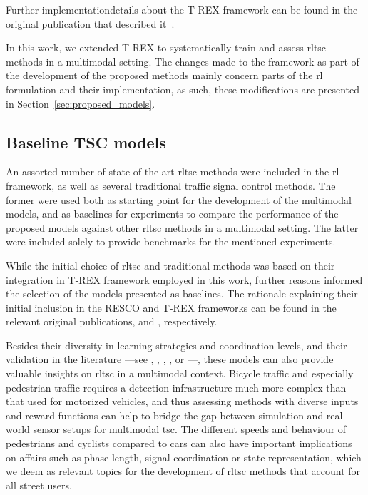 Further implementationdetails about the T-REX framework can be found in the original publication that described it~\cite{Nguyen2025}.

\medskip

\noindent In this work, we extended T-REX to systematically train and assess \gls{rltsc} methods in a multimodal setting. The changes made to the framework as part of the development of the proposed methods mainly concern parts of the \gls{rl} formulation and their implementation, as such, these modifications are presented in Section~\ref{sec:proposed_models}.

\subsection{Baseline TSC models} \label{subsec:baseline_models}
An assorted number of state-of-the-art \gls{rltsc} methods were included in the \gls{rl} framework, as well as several traditional traffic signal control methods. The former were used both as starting point for the development of the multimodal models, and as baselines for experiments to compare the performance of the proposed models against other \gls{rltsc} methods in a multimodal setting. The latter were included solely to provide benchmarks for the mentioned experiments.

While the initial choice of \gls{rltsc} and traditional methods was based on their integration in T-REX framework employed in this work, further reasons informed the selection of the models presented as baselines. The rationale explaining their initial inclusion in the RESCO and T-REX frameworks can be found in the relevant original publications, \cite{Ault2021} and \cite{Nguyen2025}, respectively.

Besides their diversity in learning strategies and coordination levels, and their validation in the literature —see \cite{Ault2019}, \cite{Ault2021}, \cite{Chen2020}, \cite{Ma2020}, \cite{Louw2022} or \cite{Nguyen2025}—, these models can also provide valuable insights on \gls{rltsc} in a multimodal context. Bicycle traffic and especially pedestrian traffic requires a detection infrastructure much more complex than that used for motorized vehicles, and thus assessing methods with diverse inputs and reward functions can help to bridge the gap between simulation and real-world sensor setups for multimodal \gls{tsc}. The different speeds and behaviour of pedestrians and cyclists compared to cars can also have important implications on affairs such as phase length, signal coordination or state representation, which we deem as relevant topics for the development of \gls{rltsc} methods that account for all street users.


